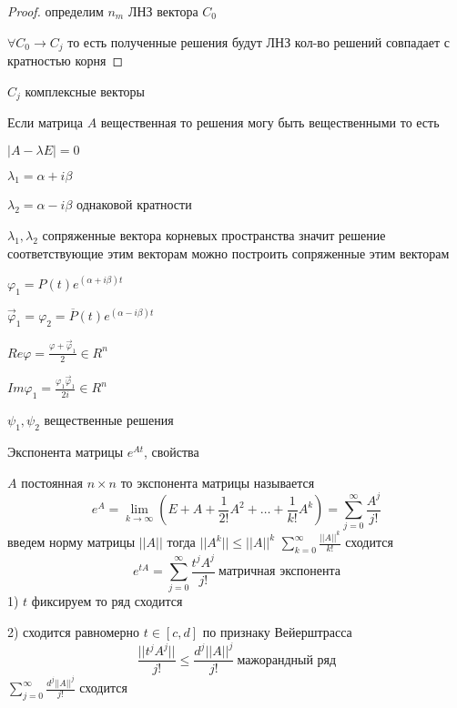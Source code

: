 \begin{proof}
  определим $n_m$ ЛНЗ вектора $C_0$

  $\forall C_0 \to C_j$ то есть полученные решения будут ЛНЗ кол-во решений
  совпадает с кратностью корня
\end{proof}

\begin{block}[Замечание]
  $C_j$ комплексные векторы

  Если матрица $A$ вещественная то решения могу быть вещественными то есть

  $|A - \lambda E| = 0$

  $\lambda_1 = \alpha + i\beta$

  $\lambda_2 = \alpha - i\beta$ однаковой кратности

  $\lambda_1, \lambda_2$ сопряженные вектора корневых пространства значит
  решение соответствующие этим векторам можно построить сопряженные этим
  векторам

  $\varphi_1 = P(t)e^{(\alpha + i\beta)t}$

  $\vec \varphi_1 = \varphi_2 = \overline{P}(t)e^{(\alpha - i\beta)t}$

  $Re\varphi = \frac{\varphi + \vec \varphi_1}{2} \in R^n$

  $Im \varphi_1 = \frac{\varphi_1 \vec \varphi_1}{2i} \in R^n$

  $\psi_1, \psi_2$ вещественные решения
\end{block}

\begin{title}[\Large]
  Экспонента матрицы $e^{At}$, свойства
\end{title}

\begin{define}
  $A$ постоянная $n \times n$ то экспонента матрицы называется
  $$
  e^A = \lim_{k \to \infty} \left( E + A + \frac{1}{2!}A^2 + \ldots +
  \frac{1}{k!} A^k \right) = \sum_{j=0}^{\infty}\frac{A^j}{j!}
  $$
  введем норму матрицы $||A||$ тогда $||A^k|| \le ||A||^k$ $\sum_{k=0}^{\infty}
  \frac{||A||^k}{k!}$ сходится
  $$
  e^{tA} = \sum_{j=0}^{\infty} \frac{t^j A^j}{j!} ~ \text{
  матричная экспонента}
  $$
  1) $t$ фиксируем то ряд сходится

  2) сходится равномерно $t \in [c,d]$  по признаку Вейерштрасса
  $$
  \frac{||t^j A^j||}{j!} \le \frac{d^j ||A||^j}{j!} ~ \text{мажорандный ряд}
  $$
  $\sum_{j=0}^{\infty}\frac{d^j ||A||^j}{j!}$ сходится
\end{define}

